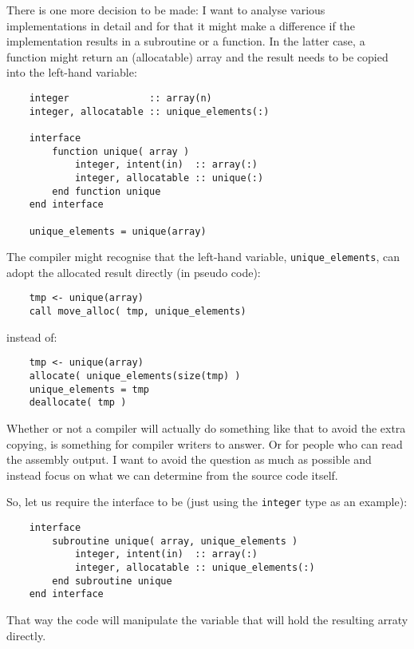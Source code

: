 \documentclass[onecolumn]{article}
\begin{document}
There is one more decision to be made: I want to analyse various implementations in detail and for that it might make
a difference if the implementation results in a subroutine or a function. In the latter case, a function might
return an (allocatable) array and the result needs to be copied into the left-hand variable:
%
\begin{verbatim}
    integer              :: array(n)
    integer, allocatable :: unique_elements(:)

    interface
        function unique( array )
            integer, intent(in)  :: array(:)
            integer, allocatable :: unique(:)
        end function unique
    end interface

    unique_elements = unique(array)
\end{verbatim}
%
The compiler might recognise that the left-hand variable, \verb+unique_elements+, can adopt the allocated result directly (in pseudo code):
\begin{verbatim}
    tmp <- unique(array)
    call move_alloc( tmp, unique_elements)
\end{verbatim}
%
instead of:
\begin{verbatim}
    tmp <- unique(array)
    allocate( unique_elements(size(tmp) )
    unique_elements = tmp
    deallocate( tmp )
\end{verbatim}
%
Whether or not a compiler will actually do something like that to avoid the extra copying, is something for compiler writers to answer. Or
for people who can read the assembly output. I want to avoid the question as much as possible and instead focus on what we can
determine from the source code itself.

So, let us require the interface to be (just using the \verb+integer+ type as an example):
%
\begin{verbatim}
    interface
        subroutine unique( array, unique_elements )
            integer, intent(in)  :: array(:)
            integer, allocatable :: unique_elements(:)
        end subroutine unique
    end interface
\end{verbatim}
%
That way the code will manipulate the variable that will hold the resulting arraty directly.
\end{document}

